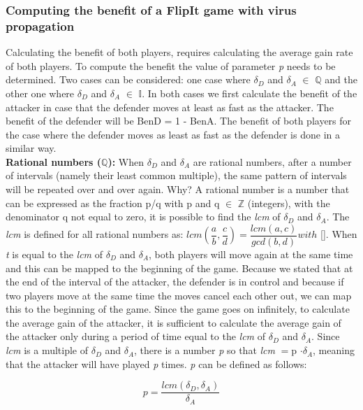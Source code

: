 \subsubsection{Computing the benefit of a FlipIt game with virus propagation}

Calculating the benefit of both players, requires calculating the average gain rate of both players. To compute the benefit the value of parameter \textit{p} needs to be determined. Two cases can be considered: one case where $\delta_{D}$ and $\delta_{A}$ $\in$ \(\mathbb{Q}\) and the other one where $\delta_{D}$ and $\delta_{A}$ $\in$ \(\mathbb{I}.\) In both cases we first calculate the benefit of the attacker in case that the defender moves at least as fast as the attacker. The benefit of the defender will be BenD = 1 - BenA. The benefit of both players for the case where the defender moves as least as fast as the defender is done in a similar way.  \\

\textbf{Rational numbers (\(\mathbb{Q}\)):} When $\delta_{D}$ and $\delta_{A}$ are rational numbers, after a number of intervals (namely their least common multiple), the same pattern of intervals will be repeated over and over again. Why? A rational number is a number that can be expressed as the fraction p/q with p and q $\in$ \(\mathbb{Z}\) (integers), with the denominator q not equal to zero, it is possible to find the \textit{lcm} of $\delta_{D}$ and $\delta_{A}$. The \textit{lcm} is defined for all rational numbers as: $lcm(\dfrac{a}{b},\dfrac{c}{d})= \dfrac{lcm( a , c)}{gcd(b,d)} with  $ []. When \textit{t} is equal to the \textit{lcm} of $\delta_{D}$ and $\delta_{A}$, both players will move again at the same time and this can be mapped to the beginning of the game. Because we stated that at the end of the interval of the attacker, the defender is in control and because if two players move at the same time the moves cancel each other out, we can map this to the beginning of the game. Since the game goes on infinitely, to calculate the average gain of the attacker, it is sufficient to calculate the average gain of the attacker only during a period of time equal to the \textit{lcm} of $\delta_{D}$ and $\delta_{A}$. Since \textit{lcm} is a multiple of $\delta_{D}$ and $\delta_{A}$, there is a number \textit{p} so that \textit{lcm} $=$p $\cdot \delta_{A}$, meaning that the attacker will have played \textit{p} times. \textit{p} can be defined as follows:


\begin{equation}\label{first}
p = \dfrac{lcm(\delta_{D},\delta_{A})}{\delta_{A} } 
\end{equation}


